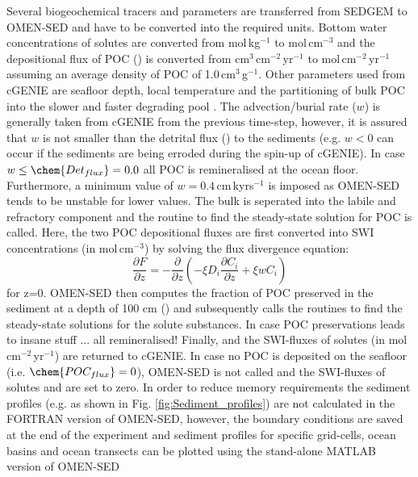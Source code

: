 \documentclass[gmd, manuscript]{copernicus}
\begin{document}
Several biogeochemical tracers and parameters are transferred from SEDGEM to OMEN-SED and have to be converted into the required units. 
Bottom water concentrations of solutes are converted from mol\,kg$^{-1}$ to mol\,cm$^{-3}$ and the depositional flux of POC () is converted from cm$^{3}$\,cm$^{-2}$\,yr$^{-1}$ 
to mol\,cm$^{-2}$\,yr$^{-1}$ assuming an average density of POC of 1.0\,cm$^{3}$\,g$^{-1}$.
Other parameters used from cGENIE are seafloor depth, local temperature and the partitioning of bulk POC into the slower and faster degrading pool 
\citep[as cGENIE represents a labile and a refractory POC fraction, see][]{ridgwell_marine_2007}. 
The advection/burial rate ($w$) is generally taken from cGENIE from the previous time-step, however, it is assured that $w$ is not smaller than the detrital flux ()
to the sediments (e.g. $w<0$ can occur if the sediments are being erroded during the spin-up of cGENIE). In case $w \leq \chem{Det_{flux}} = 0.0$ all POC is remineralised 
at the ocean floor. Furthermore, a minimum value of $w=0.4$\,cm\,kyrs$^{-1}$ is imposed as OMEN-SED tends to be unstable for lower values. 
The bulk  is seperated into the labile and refractory component and the routine to find the steady-state solution for POC is called. 
Here, the two POC depositional fluxes are first converted into SWI concentrations (in mol\,cm$^{-3}$) by solving the flux divergence equation: 
\begin{equation}
\frac{\partial F}{\partial z}=-\frac{\partial}{\partial z}\left( -\xi D_i \frac{\partial C_i}{\partial z} +\xi w C_i\right) \label{Eq_flux_divergence}
\end{equation}
for z=0. 
OMEN-SED then computes the fraction of POC preserved in the sediment at a depth of 100 cm () and subsequently calls the routines to find the steady-state 
solutions for the solute substances. 
In case POC preservations leads to insane stuff ... all remineralised!
Finally,  and the SWI-fluxes of solutes (in mol\,cm$^{-2}$\,yr$^{-1}$) are returned to cGENIE. 
In case no POC is deposited on the seafloor (i.e. $\chem{POC_{flux}}=0$), OMEN-SED is not called and the SWI-fluxes of solutes and  are set to zero. 
In order to reduce memory requirements the sediment profiles (e.g. as shown in Fig. \ref{fig:Sediment_profiles}) are not calculated in the FORTRAN version of OMEN-SED, 
however, the boundary conditions are saved at the end of the experiment and sediment profiles for specific grid-cells, ocean basins and ocean transects can be plotted 
using the stand-alone MATLAB version of OMEN-SED
\end{document}
